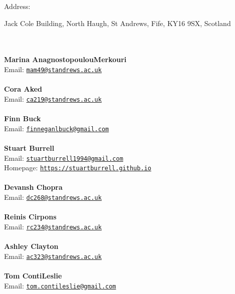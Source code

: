 \documentclass[a4paper,11pt]{report}
\begin{document}
\begin{titlepage}
{  Address: \begin{minipage}[t]{8cm}\noindent
 Jack Cole Building, North Haugh, St Andrews, Fife, KY16 9SX, Scotland\\
 \end{minipage}
}\\
{\mbox{}\\
\small \noindent \textbf{ Marina Anagnostopoulou\texttt{}Merkouri\\
  }  Email: \href{mailto://mam49@st-andrews.ac.uk} {\texttt{mam49@st\texttt{}andrews.ac.uk}}}\\
{\mbox{}\\
\small \noindent \textbf{ Cora Aked\\
  }  Email: \href{mailto://ca219@st-andrews.ac.uk} {\texttt{ca219@st\texttt{}andrews.ac.uk}}}\\
{\mbox{}\\
\small \noindent \textbf{ Finn Buck\\
  }  Email: \href{mailto://finneganlbuck@gmail.com} {\texttt{finneganlbuck@gmail.com}}}\\
{\mbox{}\\
\small \noindent \textbf{ Stuart Burrell\\
   }  Email: \href{mailto://stuartburrell1994@gmail.com} {\texttt{stuartburrell1994@gmail.com}}\\
  Homepage: \href{https://stuartburrell.github.io} {\texttt{https://stuartburrell.github.io}}}\\
{\mbox{}\\
\small \noindent \textbf{ Devansh Chopra\\
  }  Email: \href{mailto://dc268@st-andrews.ac.uk} {\texttt{dc268@st\texttt{}andrews.ac.uk}}}\\
{\mbox{}\\
\small \noindent \textbf{ Reinis Cirpons\\
  }  Email: \href{mailto://rc234@st-andrews.ac.uk} {\texttt{rc234@st\texttt{}andrews.ac.uk}}}\\
{\mbox{}\\
\small \noindent \textbf{ Ashley Clayton\\
  }  Email: \href{mailto://ac323@st-andrews.ac.uk} {\texttt{ac323@st\texttt{}andrews.ac.uk}}}\\
{\mbox{}\\
\small \noindent \textbf{ Tom Conti\texttt{}Leslie\\
   }  Email: \href{mailto://tom.contileslie@gmail.com} {\texttt{tom.contileslie@gmail.com}}\\
}
\end{titlepage}
\end{document}
